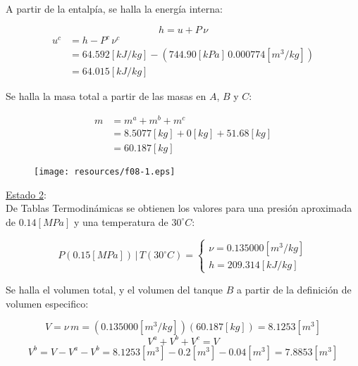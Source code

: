 \documentclass[letter,11pt]{article}
\begin{document}
\begin{enumerate}
A partir de la entalpía, se halla la energía interna:

\begin{equation*}
    h = u + P\,\nu
\end{equation*}
\begin{equation*}
    \begin{split}
        u^c &= h - P^c\,\nu^c \\
            &= 64.592[kJ/kg] - (744.90[kPa]\,0.000774[m^3/kg]) \\
            &= 64.015[kJ/kg]
    \end{split}
\end{equation*}

Se halla la masa total a partir de las masas en $A$, $B$ y $C$:

\begin{equation*}
    \begin{split}
        m &= m^a + m^b + m^c \\
          &= 8.5077[kg] + 0[kg] + 51.68[kg] \\
          &= 60.187[kg]
    \end{split}
\end{equation*}

\begin{figure}[H]
\centering
\texttt{[image: resources/f08-1.eps]}
\end{figure}

\underline{Estado 2}: \\
De Tablas Termodinámicas se obtienen los valores para una presión aproximada de
$0.14[MPa]$ y una temperatura de $30^\circ C$:

\begin{equation*}
    P(0.15[MPa])\,|\,T(30^\circ C) = \begin{cases}
        \nu = 0.135000[m^3/kg] \\
        h = 209.314[kJ/kg]
    \end{cases}
\end{equation*}

Se halla el volumen total, y el volumen del tanque $B$ a partir de la definición
de volumen especifico:

\begin{equation*}
    V = \nu\,m = (0.135000[m^3/kg])(60.187[kg]) = 8.1253[m^3]
\end{equation*}
\begin{equation*}
    V^a + V^b + V^c = V
\end{equation*}
\begin{equation*}
    V^b = V - V^a - V^b = 8.1253[m^3] - 0.2[m^3] - 0.04[m^3] = 7.8853[m^3]
\end{equation*}


\end{enumerate}
\end{document}
